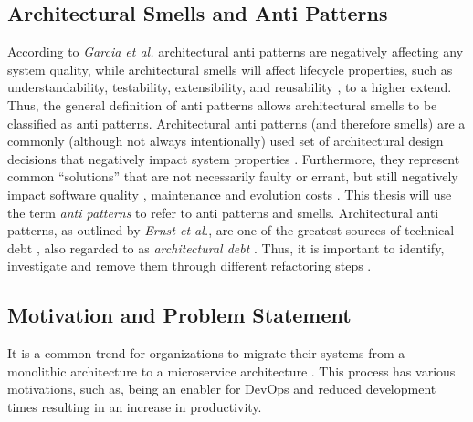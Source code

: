 \documentclass{article}
\begin{document}
\subsection{Architectural Smells and Anti Patterns}
According to \textit{Garcia et al.} architectural anti patterns are negatively affecting any system quality, while architectural smells will affect lifecycle properties, such as understandability, testability, extensibility, and reusability \cite{garcia_toward_2009}, to a higher extend. Thus, the general definition of anti patterns allows architectural smells to be classified as anti patterns. Architectural anti patterns (and therefore smells) are a commonly (although not always intentionally) used set of architectural design decisions that negatively impact system properties \cite{garcia_toward_2009}. Furthermore, they represent common “solutions” that are not necessarily faulty or errant, but still negatively impact software quality \cite{garcia_toward_2009, garcia_identifying_2009}, maintenance and evolution costs \cite{macia_relevance_2012}. This thesis will use the term \textit{anti patterns} to refer to anti patterns and smells. Architectural anti patterns, as outlined by \textit{Ernst et al.}, are one of the greatest sources of technical debt \cite{ernst_measure_2015, azadi_architectural_2019}, also regarded to as \textit{architectural debt} \cite{yuanfang_cai_detecting_2017}. Thus, it is important to identify, investigate and remove them through different refactoring steps \cite{azadi_architectural_2019}.

\subsection{Motivation and Problem Statement}
It is a common trend for organizations to migrate their systems from a monolithic architecture to a microservice architecture \cite{taibi_monolithic_2019, taibi_processes_2017, krause_microservice_2020}. This process has various motivations, such as, being an enabler for DevOps \cite{balalaie_microservices_2016, taibi_continuous_2018, pahl_architectural_2018} and reduced development times \cite{gadea_reference_2016} resulting in an increase in productivity.
\newline
\end{document}
